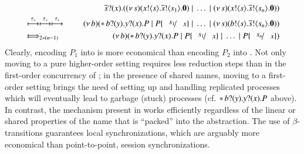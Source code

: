 \documentclass[runningheads]{llncs}
\begin{document}
{\begin{eqnarray*}
& & \qquad \qquad \binp{\dual{s}}{x} (\newsp{s}{\bout{x}{s} \bout{\dual{s}}{s_1} \inact} \Par \dots \Par \newsp{s}{\bout{x}{s} \bout{\dual{s}}{s_n}\inact})
	\\
	& \hby{\stau}  \hby{\stau} \hby{\stau} & 
	\newsp{b}{\repl \binp{b}{y} \binp{y}{x} P \Par P\subst{s_1}{x} \Par \dots \Par \newsp{s}{\bout{b}{s} \bout{\dual{s}}{s_n} \inact}}
	\\
	& \Hby{}_{2*(n - 1)} & 
	\newsp{b}{\repl \binp{b}{y} \binp{y}{x} P \Par P\subst{s_1}{x} \Par \dots \Par P\subst{s_n}{x}}
\end{eqnarray*}
Clearly, encoding $P_1$ into \HO is more economical than 
encoding $P_2$ into \sessp. Not only moving to a pure higher-order setting requires less reduction steps than in the first-order concurrency of \sessp; in the presence of shared names, moving to a first-order setting brings the need of setting up and handling replicated processes which will eventually lead to garbage (stuck) processes (cf. $\ast\, b ? (y) . y ? (x) . P$ above). In contrast, the mechanism present in \HO works efficiently regardless of the linear or shared properties of the name that is ``packed'' into the abstraction. 
The use of $\beta$-transitions guarantees local synchronizations, which are arguably more economical than point-to-point, session synchronizations.

}
\end{document}
